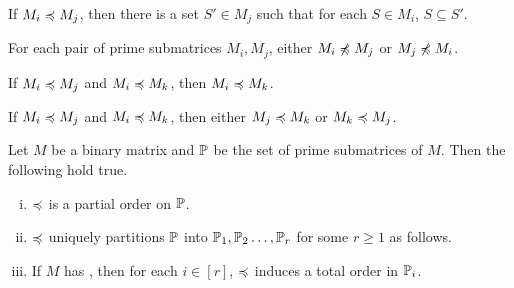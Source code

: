 \begin{lemma} %
  \label{lem:containment} If %
  $M_i \preccurlyeq M_j$, then there is a set $S' \in M_j$ such that for
  each $S \in M_i$, $S \subseteq S'$.
\end{lemma}
\begin{lemma} %
  For each pair of prime submatrices $M_i, M_j$, either $M_i \not\preccurlyeq M_j$
  or $M_j \not\preccurlyeq M_i$.
\end{lemma}
\begin{lemma} %
  If $M_i \preccurlyeq M_j$ and $M_i \preccurlyeq M_k$,
  then $M_i \preccurlyeq M_k$.
\end{lemma}
\begin{lemma} %
  If $M_i \preccurlyeq M_j$ and $M_i \preccurlyeq M_k$,
  then either $M_j \preccurlyeq M_k$ or $M_k \preccurlyeq M_j$.
\end{lemma}

\begin{theorem}  %
  \label{thm:partitionold} %
  Let $M$ be a binary matrix and $\mathbb P$ be the set of prime submatrices
  of $M$. Then the following hold true.
  \parindent {}
  \begin{enumerate}[i. ]
  \item $\preccurlyeq$ is a partial order on $\mathbb P$.
  \item \label{thm:i:chainpartition} $\preccurlyeq$ uniquely partitions $\mathbb P$ into $\mathbb P_1, \mathbb P_2
    \ldots ,\mathbb P_r$ for some $r \ge 1$ as follows. 
  \item \label{thm:i:totalorder} If $M$ has \COP, then for each $i \in
    [r]$, $\preccurlyeq$ induces a total order in $\mathbb P_i$.
  \end{enumerate}
\end{theorem}

